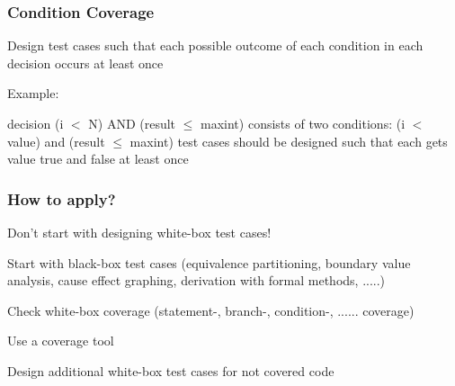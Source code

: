 
\subsubsection{Condition Coverage}

\begin{itemize*}
	\item Design test cases such that each possible outcome of each condition in each decision occurs at least once
	\item Example:
	\begin{itemize*}
		\item decision (i $<$ N) AND (result $\leq$ maxint) consists of two conditions: (i $<$ value) and (result $\leq$ maxint) test cases should be designed such that each gets value
		true and false at least once
	\end{itemize*}
\end{itemize*}


\subsubsection{How to apply?}

\begin{itemize*}
	\item Don't start with designing white-box test cases!
	\item Start with black-box test cases
	(equivalence partitioning, boundary value analysis, cause effect graphing, derivation with formal methods, .....)
	\item Check white-box coverage (statement-, branch-, condition-, ...... coverage)
	\item Use a coverage tool
	\item Design additional white-box test cases for not covered code
\end{itemize*}


